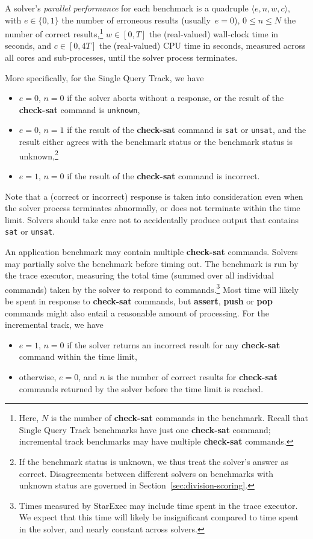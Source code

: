 \documentclass[12pt]{article}
\newcommand{\akey}[1]{\textbf{#1}}
\newcommand{\maintrack}{Single Query Track\xspace}
\begin{document}
A solver's \emph{parallel performance} for each benchmark is a quadruple $\langle
e, n, w, c\rangle$, with $e \in \{0, 1\}$ the number of erroneous
results (usually~$e = 0$), $0 \leq n \leq N$ the number of correct
results,\footnote{Here, $N$ is the number of \akey{check-sat} commands
  in the benchmark.  Recall that \maintrack benchmarks have just one
  \akey{check-sat} command; incremental track benchmarks may have
  multiple \akey{check-sat} commands.} $w \in [0,T]$ the (real-valued)
wall-clock time in seconds, and $c \in [0, 4T]$ the (real-valued) CPU
time in seconds, measured across all cores and sub-processes, until
the solver process terminates.

\header{\maintrack.} More specifically, for the \maintrack, we have
%
\begin{itemize}
\item $e=0$, $n=0$ if the solver aborts without a response, or the
  result of the \akey{check-sat} command is \texttt{unknown},
\item $e=0$, $n=1$ if the result of the \akey{check-sat} command is
  \texttt{sat} or \texttt{unsat}, and the result either agrees with
  the benchmark status or the benchmark status is unknown,\footnote{If
    the benchmark status is unknown, we thus treat the solver's answer
    as correct.  Disagreements between different solvers on benchmarks
    with unknown status are governed in
    Section~\ref{sec:division-scoring}.}
\item $e=1$, $n=0$ if the result of the \akey{check-sat} command is
  incorrect.
\end{itemize}
%
Note that a (correct or incorrect) response is taken into
consideration even when the solver process terminates abnormally, or
does not terminate within the time limit.  Solvers should take care
not to accidentally produce output that contains \texttt{sat} or
\texttt{unsat}.

%
An application benchmark may contain multiple \akey{check-sat}
commands.  Solvers may partially solve the benchmark before timing
out.  The benchmark is run by the trace executor, measuring the total
time (summed over all individual commands) taken by the solver to
respond to commands.\footnote{Times measured by StarExec may include
  time spent in the trace executor.  We expect that this time will
  likely be insignificant compared to time spent in the solver, and
  nearly constant across solvers.}  Most time will likely be spent in
response to \akey{check-sat} commands, but \akey{assert}, \akey{push}
or \akey{pop} commands might also entail a reasonable amount of
processing.  For the incremental track, we have
\begin{itemize}
\item $e=1$, $n=0$ if the solver returns an incorrect result for any
  \akey{check-sat} command within the time limit,
\item otherwise, $e=0$, and $n$ is the number of correct results for
  \akey{check-sat} commands returned by the solver before the time
  limit is reached.
\end{itemize}
\end{document}
